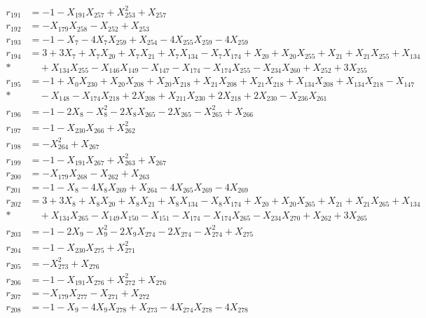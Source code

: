 \begin{align*}
r_{191} &= -1 - X_{191}X_{257} + X_{253}^{2} + X_{257} \\[3pt]
r_{192} &= -X_{179}X_{258} - X_{252} + X_{253} \\[3pt]
r_{193} &= -1 - X_{7} - 4X_{7}X_{259} + X_{254} - 4X_{255}X_{259} - 4X_{259} \\[3pt]
r_{194} &= 3 + 3X_{7} + X_{7}X_{20} + X_{7}X_{21} + X_{7}X_{134} - X_{7}X_{174} + X_{20} + X_{20}X_{255} + X_{21} + X_{21}X_{255} + X_{134} \\*
&\quad  + X_{134}X_{255} - X_{146}X_{149} - X_{147} - X_{174} - X_{174}X_{255} - X_{234}X_{260} + X_{252} + 3X_{255} \\[3pt]
r_{195} &= -1 + X_{0}X_{230} + X_{20}X_{208} + X_{20}X_{218} + X_{21}X_{208} + X_{21}X_{218} + X_{134}X_{208} + X_{134}X_{218} - X_{147} \\*
&\quad  - X_{148} - X_{174}X_{218} + 2X_{208} + X_{211}X_{230} + 2X_{218} + 2X_{230} - X_{236}X_{261} \\[3pt]
r_{196} &= -1 - 2X_{8} - X_{8}^{2} - 2X_{8}X_{265} - 2X_{265} - X_{265}^{2} + X_{266} \\[3pt]
r_{197} &= -1 - X_{230}X_{266} + X_{262}^{2} \\[3pt]
r_{198} &= -X_{264}^{2} + X_{267} \\[3pt]
r_{199} &= -1 - X_{191}X_{267} + X_{263}^{2} + X_{267} \\[3pt]
r_{200} &= -X_{179}X_{268} - X_{262} + X_{263} \\[3pt]
r_{201} &= -1 - X_{8} - 4X_{8}X_{269} + X_{264} - 4X_{265}X_{269} - 4X_{269} \\[3pt]
r_{202} &= 3 + 3X_{8} + X_{8}X_{20} + X_{8}X_{21} + X_{8}X_{134} - X_{8}X_{174} + X_{20} + X_{20}X_{265} + X_{21} + X_{21}X_{265} + X_{134} \\*
&\quad  + X_{134}X_{265} - X_{149}X_{150} - X_{151} - X_{174} - X_{174}X_{265} - X_{234}X_{270} + X_{262} + 3X_{265} \\[3pt]
r_{203} &= -1 - 2X_{9} - X_{9}^{2} - 2X_{9}X_{274} - 2X_{274} - X_{274}^{2} + X_{275} \\[3pt]
r_{204} &= -1 - X_{230}X_{275} + X_{271}^{2} \\[3pt]
r_{205} &= -X_{273}^{2} + X_{276} \\[3pt]
r_{206} &= -1 - X_{191}X_{276} + X_{272}^{2} + X_{276} \\[3pt]
r_{207} &= -X_{179}X_{277} - X_{271} + X_{272} \\[3pt]
r_{208} &= -1 - X_{9} - 4X_{9}X_{278} + X_{273} - 4X_{274}X_{278} - 4X_{278} \\[3pt]

\end{align*}
